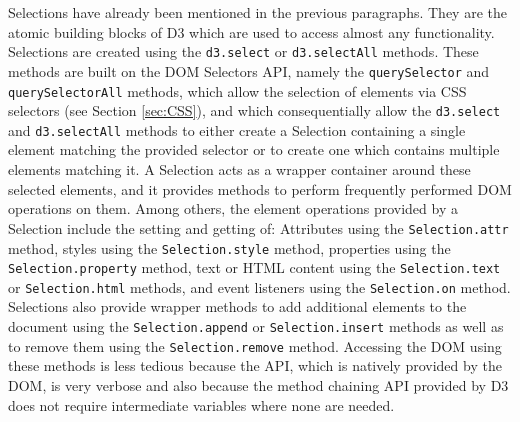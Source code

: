 Selections have already been mentioned in the previous paragraphs.
They are the atomic building blocks of D3 which are used to access almost any functionality.
Selections are created using the \lstinline{d3.select} or \lstinline{d3.selectAll} methods.
These methods are built on the DOM Selectors API, namely the \lstinline{querySelector} and \lstinline{querySelectorAll} methods, which allow the selection of elements via CSS selectors (see Section \ref{sec:CSS}), and which consequentially allow the \lstinline{d3.select} and \lstinline{d3.selectAll} methods to either create a Selection containing a single element matching the provided selector or to create one which contains multiple elements matching it.
A Selection acts as a wrapper container around these selected elements, and it provides methods to perform frequently performed DOM operations on them.
Among others, the element operations provided by a Selection include the setting and getting of: Attributes using the \lstinline{Selection.attr} method, styles using the \lstinline{Selection.style} method, properties using the \lstinline{Selection.property} method, text or HTML content using the \lstinline{Selection.text} or \lstinline{Selection.html} methods, and event listeners using the \lstinline{Selection.on} method.
Selections also provide wrapper methods to add additional elements to the document using the \lstinline{Selection.append} or \lstinline{Selection.insert} methods as well as to remove them using the \lstinline{Selection.remove} method.
Accessing the DOM using these methods is less tedious because the API, which is natively provided by the DOM, is very verbose and also because the method chaining API provided by D3 does not require intermediate variables where none are needed.


